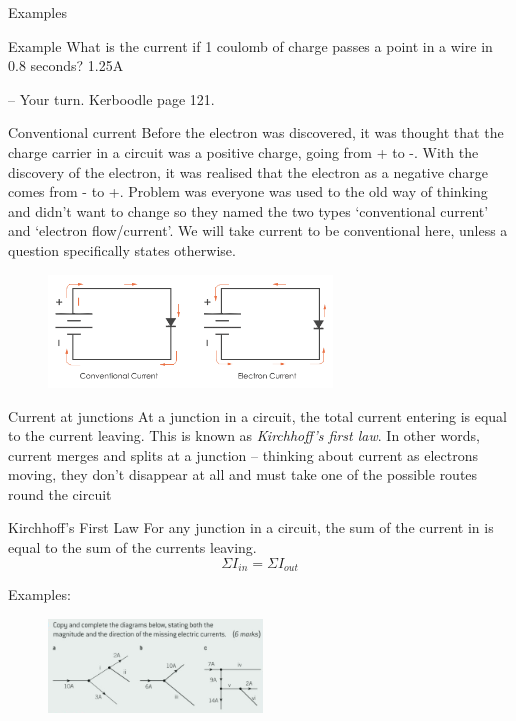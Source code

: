 \documentclass[../Main.tex]{subfiles}
\begin{document}
\begin{frame}{Examples}
    \begin{exampleblock}{Example}
    What is the current if 1 coulomb of charge passes a point in a wire in 0.8 seconds? \newline \pause
    1.25A
    \end{exampleblock}
    
    \pause
    -- Your turn. Kerboodle page 121.
\end{frame}

\begin{frame}{Conventional current}
    Before the electron was discovered, it was thought that the charge carrier in a circuit was a positive charge, going from + to -. \pause 
    With the discovery of the electron, it was realised that the electron as a negative charge comes from - to +.
    \newline \newline \pause
    Problem was everyone was used to the old way of thinking and didn't want to change so they named the two types `conventional current' and `electron flow/current'. We will take current to be conventional here, unless a question specifically states otherwise.
    
    \begin{figure}
        \centering
        \includegraphics[height=3cm]{Electricity_Images/conventional_current.png}
    \end{figure}
\end{frame}

\begin{frame}{Current at junctions}
    At a junction in a circuit, the total current entering is equal to the current leaving. This is known as \emph{Kirchhoff's first law}. In other words, current merges and splits at a junction -- thinking about current as electrons moving, they don't disappear at all and must take one of the possible routes round the circuit
    \pause
    \begin{block}{Kirchhoff's First Law}
    For any junction in a circuit, the sum of the current in is equal to the sum of the currents leaving.
    \begin{equation*}
        \Sigma I_{in} = \Sigma I_{out}
    \end{equation*}
    \end{block}
    \pause
    Examples:
    \begin{figure}
        \centering
        \includegraphics[height=2.5cm]{Electricity_Images/kerboodle_Qs.png}
    \end{figure}
\end{frame}
\end{document}
